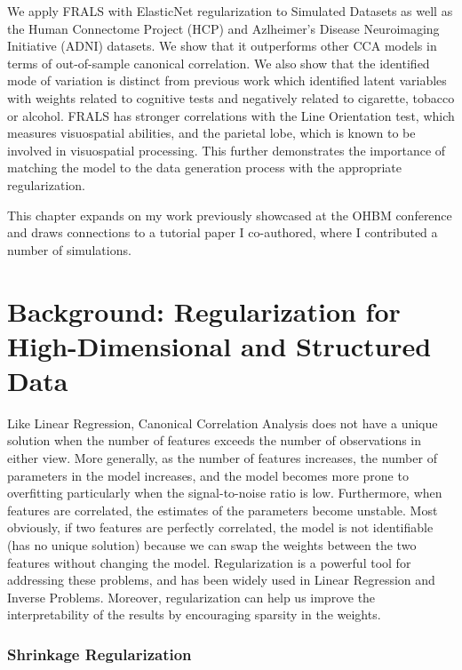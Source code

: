 We apply FRALS with ElasticNet regularization to Simulated Datasets as well as the Human Connectome Project (HCP) and Azlheimer's Disease Neuroimaging Initiative (ADNI) datasets.
We show that it outperforms other CCA models in terms of out-of-sample canonical correlation.
We also show that the identified mode of variation is distinct from previous work which identified latent variables with \gls{weights} related to cognitive tests and negatively related to cigarette, tobacco or alcohol\citep{smith2015positive}.
FRALS has stronger correlations with the Line Orientation test, which measures visuospatial abilities, and the parietal lobe, which is known to be involved in visuospatial processing.
This further demonstrates the importance of matching the model to the data generation process with the appropriate regularization.

This chapter expands on my work previously showcased at the OHBM conference and draws connections to a tutorial paper I co-authored, where I contributed a number of simulations\citep{mihalik2022canonical}.

\section{Background: Regularization for High-Dimensional and Structured Data}\label{sec:background}

Like Linear Regression, Canonical Correlation Analysis does not have a unique solution when the number of features exceeds the number of observations in either view.
More generally, as the number of features increases, the number of parameters in the model increases, and the model becomes more prone to overfitting particularly when the signal-to-noise ratio is low.
Furthermore, when features are correlated, the estimates of the parameters become unstable.
Most obviously, if two features are perfectly correlated, the model is not identifiable (has no unique solution) because we can swap the \gls{weights} between the two features without changing the model.
Regularization is a powerful tool for addressing these problems, and has been widely used in Linear Regression and Inverse Problems.
Moreover, regularization can help us improve the interpretability of the results by encouraging sparsity in the weights.

\subsubsection{Shrinkage Regularization}


